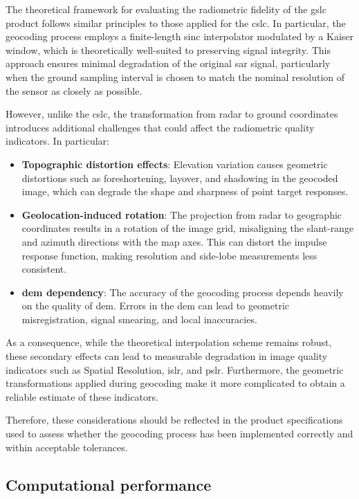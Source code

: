 The theoretical framework for evaluating the radiometric fidelity of the \acs{gslc} product follows similar principles to those applied for the \acs{cslc}. In particular, the geocoding process employs a finite-length sinc interpolator modulated by a Kaiser window, which is theoretically well-suited to preserving signal integrity. This approach ensures minimal degradation of the original \acs{sar} signal, particularly when the ground sampling interval is chosen to match the nominal resolution of the sensor as closely as possible.

However, unlike the \acs{cslc}, the transformation from radar to ground coordinates introduces additional challenges that could affect the radiometric quality indicators. In particular:

\begin{itemize}
    \item \textbf{Topographic distortion effects}: Elevation variation causes geometric distortions such as foreshortening, layover, and shadowing in the geocoded image, which can degrade the shape and sharpness of point target responses.
    \item \textbf{Geolocation-induced rotation}: The projection from radar to geographic coordinates results in a rotation of the image grid, misaligning the slant-range and azimuth directions with the map axes. This can distort the impulse response function, making resolution and side-lobe measurements less consistent.
    \item \textbf{\acs{dem} dependency}: The accuracy of the geocoding process depends heavily on the quality of \acs{dem}. Errors in the \acs{dem} can lead to geometric misregistration, signal smearing, and local inaccuracies.
\end{itemize}

As a consequence, while the theoretical interpolation scheme remains robust, these secondary effects can lead to measurable degradation in image quality indicators such as Spatial Resolution, \acs{islr}, and \acs{pslr}. Furthermore, the geometric transformations applied during geocoding make it more complicated to obtain a reliable estimate of these indicators.

Therefore, these considerations should be reflected in the product specifications used to assess whether the geocoding process has been implemented correctly and within acceptable tolerances. 



\subsection{Computational performance}
\label{sec:cslc_computation}

